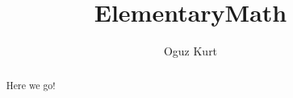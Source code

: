 \documentclass{xourse}
\title{ElementaryMath}
\author{Oguz Kurt}
\begin{document}
 

\begin{abstract}
Here we go!
\end{abstract}

\maketitle
{}
\end{document}
